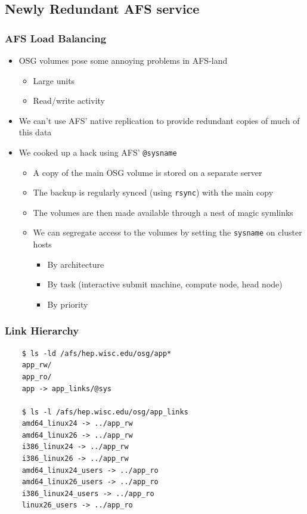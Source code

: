 \documentclass{beamer}
\begin{document}
\subsection{Newly Redundant AFS service}
\begin{frame}
\frametitle{AFS Load Balancing}
\begin{itemize}
    \item OSG volumes pose some annoying problems in AFS-land
    \begin{itemize}
        \item Large units
        \item Read/write activity
    \end{itemize}
    \item We can't use AFS' native replication to provide redundant copies of  
    much of this data
    \item We cooked up a hack using AFS' {\tt @sysname}
    \begin{itemize}
        \item A copy of the main OSG volume is stored on a separate server
        \item The backup is regularly synced (using {\tt rsync}) with the main copy
        \item The volumes are then made available through a nest of magic symlinks
        \item We can segregate access to the volumes by setting the {\tt sysname} on cluster hosts
        \begin{itemize}
            \item By architecture
            \item By task (interactive submit machine, compute node, head node)
            \item By priority
        \end{itemize}
    \end{itemize}
\end{itemize}
\end{frame}

\begin{frame}[fragile]
\frametitle{Link Hierarchy}
\begin{verbatim}
    $ ls -ld /afs/hep.wisc.edu/osg/app*
    app_rw/
    app_ro/
    app -> app_links/@sys

    $ ls -l /afs/hep.wisc.edu/osg/app_links
    amd64_linux24 -> ../app_rw
    amd64_linux26 -> ../app_rw
    i386_linux24 -> ../app_rw
    i386_linux26 -> ../app_rw
    amd64_linux24_users -> ../app_ro
    amd64_linux26_users -> ../app_ro
    i386_linux24_users -> ../app_ro
    linux26_users -> ../app_ro
\end{verbatim}
\end{frame}
\end{document}
